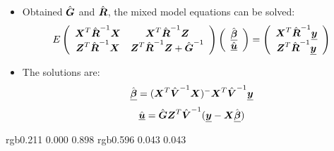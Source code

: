 
\begin{frame}
  \begin{itemize}
    \vspace{0.5cm}
    \item Obtained $ \hat{\boldsymbol{G}} $ and $ \hat{\boldsymbol{R}} $, the mixed model equations can be solved:
      $$
        E\left(
          \begin{array}{cc} 
            \boldsymbol{X}^T \hat{\boldsymbol{R}}^{-1} \boldsymbol{X} &  \boldsymbol{X}^T \hat{\boldsymbol{R}}^{-1} \boldsymbol{Z} \\
            \boldsymbol{Z}^T \hat{\boldsymbol{R}}^{-1} \boldsymbol{X} &  \boldsymbol{Z}^T \hat{\boldsymbol{R}}^{-1} \boldsymbol{Z} + \hat{\boldsymbol{G}}^{-1} \\  
          \end{array}
        \right) \left(
          \begin{array}{c} 
            \hat{\boldsymbol{\underline{\beta}}} \\
            \hat{\boldsymbol{\underline{u}}} \\ 
          \end{array}
        \right) = \left(
          \begin{array}{c} 
            \boldsymbol{X}^T \hat{\boldsymbol{R}}^{-1} \boldsymbol{\underline{y}} \\
            \boldsymbol{Z}^T \hat{\boldsymbol{R}}^{-1} \boldsymbol{\underline{y}} \\
          \end{array}
        \right) 
      $$
    \vspace{0.5cm}
    \item The solutions are:
      $$ \hat{\boldsymbol{\underline{\beta}}} = (\boldsymbol{X}^T \hat{\boldsymbol{V}}^{-1} \boldsymbol{X})^{-} \boldsymbol{X}^T \hat{\boldsymbol{V}}^{-1} \boldsymbol{\underline{y}} $$
      $$ \hat{\boldsymbol{\underline{u}}} = \hat{\boldsymbol{G}} \boldsymbol{Z}^T \hat{\boldsymbol{V}}^{-1} ( \boldsymbol{\underline{y}} - \boldsymbol{X} \hat{\boldsymbol{\underline{\beta}}} ) $$
  \end{itemize}
\end{frame}





\definecolor{darkblue} {rgb}{0.211 0.000 0.898}
\definecolor{circlered}  {rgb}{0.596 0.043 0.043}

